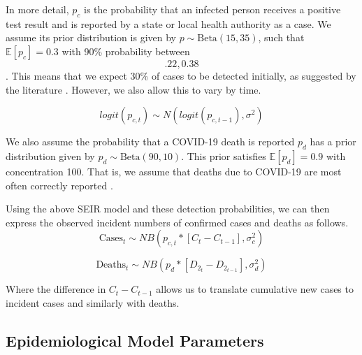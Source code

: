 \documentclass[11pt]{amsart}
\newcommand{\Beta}{\text{Beta}}
\newcommand{\E}{\mathbb{E}}
\begin{document}
In more detail, $p_c$ is the probability that an infected person receives a positive test result and is reported by a state or local health authority as a case. We assume its prior distribution is given by  $p \sim \Beta(15, 35)$, such that  $\E[p_c] = 0.3$  with 90\% probability between \[ .22,0.38\]. This means that we expect 30\% of cases to be detected initially, as suggested by the literature \cite{midas}. However, we also allow this to vary by time.

\begin{equation}
logit(p_{c,t}) \sim N(logit(p_{c,t-1}), \sigma^2)
\end{equation}

We also assume the probability that a COVID-19 death is reported $p_d$ has a prior distribution given by  $p_d \sim \Beta(90, 10)$. This prior satisfies $\E[p_d] = 0.9$ with concentration 100. That is, we assume that deaths due to COVID-19 are most often correctly reported \cite{weinberger2020estimation}. 

 


Using the above SEIR model and these detection probabilities, we can then express the observed incident numbers of confirmed cases and deaths as follows.
\begin{equation}
\text{Cases}_{t} \sim NB(p_{c,t}*[C_{t} - C_{t-1}],\sigma_{c}^2)
\end{equation}

\begin{equation}
\text{Deaths}_{t} \sim NB(p_d*[D_{2_{t}} - D_{2_{t-1}}], \sigma_d^2)
\end{equation}

Where the difference in $C_{t}-C_{t-1}$ allows us to translate cumulative new cases to incident cases and similarly with deaths. 
%

\subsection{Epidemiological Model Parameters}
\end{document}
